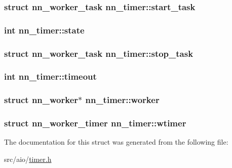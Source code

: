 \subsubsection[{start\+\_\+task}]{\setlength{\rightskip}{0pt plus 5cm}struct {\bf nn\+\_\+worker\+\_\+task} nn\+\_\+timer\+::start\+\_\+task}\hypertarget{structnn__timer_ae8c14b7f156c28cf75eb0853ea5a3ff1}{}\label{structnn__timer_ae8c14b7f156c28cf75eb0853ea5a3ff1}
\subsubsection[{state}]{\setlength{\rightskip}{0pt plus 5cm}int nn\+\_\+timer\+::state}\hypertarget{structnn__timer_add4f847855d22e1fe8dc34761dd6cf9a}{}\label{structnn__timer_add4f847855d22e1fe8dc34761dd6cf9a}
\subsubsection[{stop\+\_\+task}]{\setlength{\rightskip}{0pt plus 5cm}struct {\bf nn\+\_\+worker\+\_\+task} nn\+\_\+timer\+::stop\+\_\+task}\hypertarget{structnn__timer_ae06667d9c88c1da44d67328354f75ae0}{}\label{structnn__timer_ae06667d9c88c1da44d67328354f75ae0}
\subsubsection[{timeout}]{\setlength{\rightskip}{0pt plus 5cm}int nn\+\_\+timer\+::timeout}\hypertarget{structnn__timer_ae745dcc75be2f6878bb77b21223f1b02}{}\label{structnn__timer_ae745dcc75be2f6878bb77b21223f1b02}
\subsubsection[{worker}]{\setlength{\rightskip}{0pt plus 5cm}struct {\bf nn\+\_\+worker}$\ast$ nn\+\_\+timer\+::worker}\hypertarget{structnn__timer_aefae7d82dbdbc7ed2e52b59be2f1977e}{}\label{structnn__timer_aefae7d82dbdbc7ed2e52b59be2f1977e}
\subsubsection[{wtimer}]{\setlength{\rightskip}{0pt plus 5cm}struct {\bf nn\+\_\+worker\+\_\+timer} nn\+\_\+timer\+::wtimer}\hypertarget{structnn__timer_abfb3e66a216d8c107add935b2b7aeb61}{}\label{structnn__timer_abfb3e66a216d8c107add935b2b7aeb61}


The documentation for this struct was generated from the following file\+:\begin{DoxyCompactItemize}
\item 
src/aio/\hyperlink{timer_8h}{timer.\+h}\end{DoxyCompactItemize}
